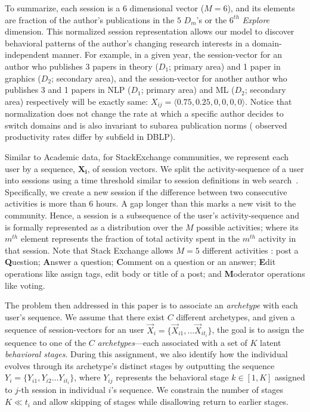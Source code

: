 To summarize, each session is a $6$ dimensional vector ($M=6$), and its elements are fraction of the author's publications in the $5$ $D_m$'s or the $6^{th}$ \emph{Explore} dimension. This normalized session representation allows our model to discover behavioral patterns of the author's changing research interests in a domain-independent manner. For example, in a given year, the session-vector for an author who publishes 3 papers in theory ($D_1$; primary area) and 1 paper in graphics ($D_2$; secondary area), and the session-vector for another author who publishes 3 and 1 papers in NLP ($D_1$; primary area) and ML ($D_2$; secondary area) respectively will be exactly same: $X_{ij} = \langle 0.75, 0.25, 0, 0, 0, 0\rangle$. Notice that normalization does not change the rate at which a specific author decides to switch domains and is also invariant to subarea publication norms (\cite{Way:2016} observed productivity rates differ by subfield in DBLP).

Similar to Academic data, for StackExchange communities, we represent each user by a sequence, $\mathbf{X_i}$, of session vectors. We split the activity-sequence of a user into sessions using a time threshold similar to session definitions in web search~\citep{Narang:2017}. Specifically, we create a new session if the difference between two consecutive activities is more than 6 hours. A gap longer than this marks
a new visit to the community. Hence, a session is a subsequence of the user's activity-sequence and is formally represented as a distribution over the $M$ possible activities; where its $m^{th}$ element represents the fraction of total activity spent in the $m^{th}$ activity in that session. Note that Stack Exchange allows $M=5$ different activities : post a \textbf{Q}uestion; \textbf{A}nswer a question;
\textbf{C}omment on a question or an answer; \textbf{E}dit operations like assign tags, edit body or title of a post; and \textbf{M}oderator operations like voting.


The problem then addressed in this paper is to associate an \emph{archetype} with each
user's sequence.
We assume that there exist $C$ different archetypes, and given a sequence of session-vectors for an
user $\vec{X}_i = \{\vec{X}_{i 1}, \ldots \vec{X}_{i t_i} \}$, the goal is to assign the sequence to one of the $C$ \emph{archetypes}---each associated with a set of $K$ latent \emph{behavioral stages}. During this assignment, we also identify how the individual evolves through its archetype's distinct stages by outputting the sequence $Y_i = \{Y_{i 1}, Y_{i 2} \ldots Y_{i t_i} \}$, where $Y_{i j}$ represents the behavioral stage $k \in [1,K] $ assigned to $j$-th session in individual $i$'s sequence. We constrain the number of stages $ K \ll t_i$ and allow skipping of stages while disallowing return to earlier stages.

